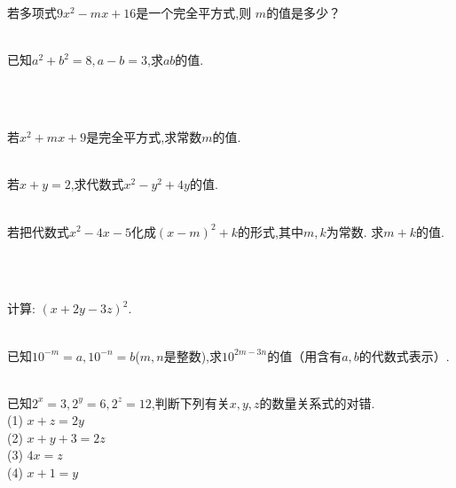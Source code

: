 \\ \\
\item{
    若多项式$ 9x^2 - mx+16$是一个完全平方式,则 $m$的值是多少？
}
\\ \\
\item{
    已知$a^2+b^2=8, a-b=3$,求$ab$的值.
    \iffalse
    \fangsong\zihao{4}
    思路: 看到$a^2+b^2, a-b, ab$, 应该想到完全平方公式.
    \fi
}
\\ \\
\item{
    若$x^2+mx+9$是完全平方式,求常数$m$的值.
}
\\ \\
\item{
    若$x+y=2$,求代数式$x^2-y^2+4y$的值.
}
\\ \\
\item{
    若把代数式$x^2-4x-5$化成$(x-m)^2+k$的形式,其中$m,k$为常数. 求$m+k$的值.
    \iffalse
    \fangsong\zihao{4}
    思路: 把$(x-m)^2+k$转化为$ax^2+bx+c$的形式,再比较各项系数,解出$m,k$.\\
    注意: 系数的位置.

    解答: 
    \begin{align*}
        (x-m)^2+k &= x^2-2mx+m^2+k
    \end{align*}
    与$x^2-4x-5$比较,对应项的系数相等,常数项相等,得到方程
    \[\left\{ 
        \begin{array}{lc}
            2m = 4\\
            m^2+k=-5
        \end{array}
    \right.\]
    解得
    \[\left\{ 
        \begin{array}{lc}
            m = 2\\
            k =-9
        \end{array}
    \right.\]
    $\therefore m+k=-7.$
    \fi
}
\\ \\
\item{
    计算: $(x+2y-3z)^2$.
}
\\ \\
\item{
    已知$10^{-m}=a, 10^{-n}=b$($m, n$是整数),求$10^{2m-3n}$的值（用含有$a, b$的代数式表示）.
}
\\ \\
\item{
    已知$2^x=3, 2^y=6, 2^z=12$,判断下列有关$x, y, z$的数量关系式的对错.\\
    (1) $x+z=2y$\\
    (2) $x+y+3=2z$\\
    (3) $4x=z$\\
    (4) $x+1=y$
}
